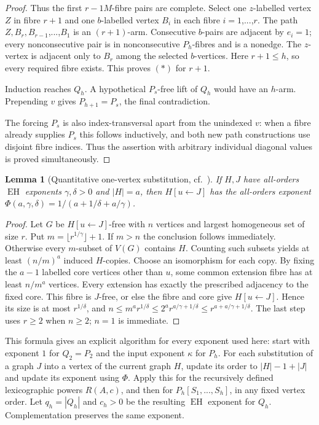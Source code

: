 \documentclass[11pt,a4paper]{article}
\newtheorem{lemma}[theorem]{Lemma}
\theoremstyle{definition}
\theoremstyle{remark}
\numberwithin{equation}{section}
\begin{document}
\begin{proof}
Thus the first \(r-1 M\)-fibre pairs are complete. Select one \(z\)-labelled vertex \(Z\) in fibre \(r+1\) and one \(b\)-labelled vertex \(B_{i}\) in each fibre \(i=1\),...,\(r\). The path \(Z,\allowbreak B_{r},\allowbreak B_{r-1}\),...,\(B_{1}\) is an \((r+1)\)-arm. Consecutive \(b\)-pairs are adjacent by \(e_{i}=1\); every nonconsecutive pair is in nonconsecutive \(P_{h}\)-fibres and is a nonedge. The \(z\)-vertex is adjacent only to \(B_{r}\) among the selected \(b\)-vertices. Here \(r+1\le\allowbreak h\), so every required fibre exists. This proves \((\ast)\) for \(r+1\).

Induction reaches \(Q_{h}\). A hypothetical \(P_{s}\)-free lift of \(Q_{h}\) would have an \(h\)-arm. Prepending \(v\) gives \(P_{h+1}=P_{s}\), the final contradiction.

The forcing \(P_{s}\) is also index-transversal apart from the unindexed \(v\): when a fibre already supplies \(P_{s}\) this follows inductively, and both new path constructions use disjoint fibre indices. Thus the assertion with arbitrary individual diagonal values is proved simultaneously.


\end{proof}
\begin{lemma}[Quantitative one-vertex substitution, cf.\ \cite{aps}]\label{lem:substitution}
If \(H,\allowbreak J\) have all-orders \(\operatorname{EH}\) exponents \(\gamma,\allowbreak \delta>0\) and \(|H|=a\), then \(H[u\leftarrow J]\) has the all-orders exponent \(\Phi(a,\allowbreak \gamma,\allowbreak \delta) = 1/(a+1/\delta+a/\gamma)\).
\end{lemma}\begin{proof}
Let \(G\) be \(H[u\leftarrow J]\)-free with \(n\) vertices and largest homogeneous set of size \(r\). Put \(m=\lfloor r^{1/\gamma}\rfloor+1\). If \(m>n\) the conclusion follows immediately. Otherwise every \(m\)-subset of \(V(G)\) contains \(H\). Counting such subsets yields at least \((n/m)^{a}\) induced \(H\)-copies. Choose an isomorphism for each copy. By fixing the \(a-1\) labelled core vertices other than \(u\), some common extension fibre has at least \(n/m^{a}\) vertices. Every extension has exactly the prescribed adjacency to the fixed core. This fibre is \(J\)-free, or else the fibre and core give \(H[u\leftarrow J]\). Hence its size is at most \(r^{1/\delta}\), and \(n \le\allowbreak  m^{a} r^{1/\delta} \le\allowbreak  2^{a} r^{a/\gamma+1/\delta} \le\allowbreak  r^{a+a/\gamma+1/\delta}\). The last step uses \(r\ge\allowbreak 2\) when \(n\ge\allowbreak 2\); \(n=1\) is immediate.
\end{proof}
This formula gives an explicit algorithm for every exponent used here: start with exponent \(1\) for \(Q_{2}=P_{2}\) and the input exponent \(\kappa\) for \(P_{h}\). For each substitution of a graph \(J\) into a vertex of the current graph \(H\), update its order to \(|H|-1+|J|\) and update its exponent using \(\Phi\). Apply this for the recursively defined lexicographic powers \(R(A,\allowbreak c)\), and then for \(P_{h}[S_{1},\allowbreak ...,\allowbreak S_{h}]\), in any fixed vertex order. Let \(q_{h}=|Q_{h}|\) and \(c_{h}>0\) be the resulting \(\operatorname{EH}\) exponent for \(Q_{h}\). Complementation preserves the same exponent.
\end{document}
